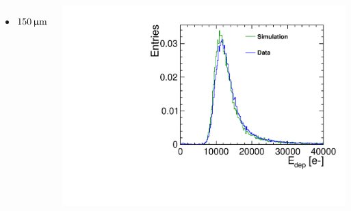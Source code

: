 \begin{frame}
\begin{columns}
    \begin{itemize}
    \item $150\,\upmu\mathrm{m}$
    \end{itemize}
    \centering
    \includegraphics[width=\textwidth]{../figures/TestBeam/150micron_Edep.pdf}
  \end{columns}

\end{frame}

